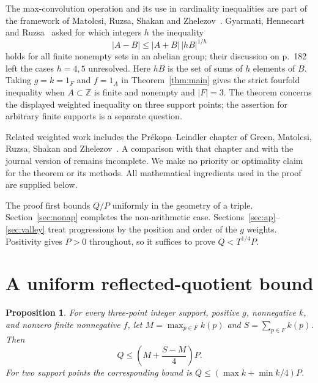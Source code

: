 \documentclass[11pt,a4paper]{article}
\newtheorem{proposition}[theorem]{Proposition}
\theoremstyle{remark}
\newcommand{\Z}{\mathbb Z}
\begin{document}
The max-convolution operation and its use in cardinality inequalities are
part of the framework of Matolcsi, Ruzsa, Shakan and
Zhelezov~\cite[Definition~8.1 and Section~8]{mrsz}.
Gyarmati, Hennecart and Ruzsa~\cite[equation~(9), p.~177]{ghr} asked for
which integers $h$ the inequality
\[
 |A-B|\le |A+B|\,|hB|^{1/h}
\]
holds for all finite nonempty sets in an abelian group; their discussion
on p.~182 left the cases $h=4,5$ unresolved. Here $hB$ is the set of sums
of $h$ elements of $B$. Taking $g=k=1_F$ and $f=1_A$ in
Theorem~\ref{thm:main} gives the strict fourfold inequality when
$A\subset\Z$ is finite and nonempty and $|F|=3$.
The theorem concerns the displayed weighted inequality on three support
points; the assertion for arbitrary finite supports is a separate question.

Related weighted work includes the Pr\'ekopa--Leindler chapter of Green,
Matolcsi, Ruzsa, Shakan and Zhelezov~\cite{gmrsz}.
A comparison with that chapter and with the journal version of
\cite{mrsz} remains incomplete. We make no priority or optimality claim
for the theorem or its methods. All mathematical ingredients used in the
proof are supplied below.

The proof first bounds $Q/P$ uniformly in the geometry of a triple.
Section~\ref{sec:nonap} completes the non-arithmetic case.
Sections~\ref{sec:ap}--\ref{sec:valley} treat progressions by the position
and order of the $g$ weights. Positivity gives $P>0$ throughout, so it
suffices to prove $Q<T^{1/4}P$.

\section{A uniform reflected-quotient bound}

\begin{proposition}\label{prop:quotient}
For every three-point integer support, positive $g$, nonnegative $k$,
and nonzero finite nonnegative $f$, let
$M=\max_{p\in F}k(p)$ and $S=\sum_{p\in F}k(p)$. Then
\begin{equation}\label{eq:quotient}
 Q\le\left(M+\frac{S-M}{4}\right)P.
\end{equation}
For two support points the corresponding bound is
$Q\le(\max k+\min k/4)P$.
\end{proposition}
\end{document}

